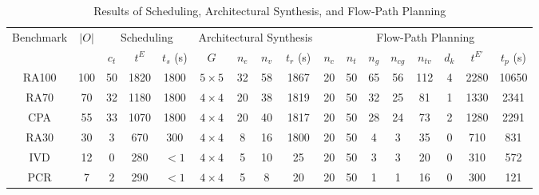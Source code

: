 \begin{table*}[ht]\normalsize
  \centering
  \caption{Results of Scheduling, Architectural Synthesis, and Flow-Path Planning}
    \begin{tabular}{|c||c||c|c|c||c|c|c|c||c|c|c|c|c|c|c|c|}\hline
    \multirow{2}[0]{*}{Benchmark} & \multirow{2}[0]{*}{$|O|$} & \multicolumn{3}{c||}{Scheduling} & \multicolumn{4}{c||}{Architectural Synthesis} & \multicolumn{8}{c|}{Flow-Path Planning} \\\cline{3-17}
          &       & $c_t$    & $t^E$    & $t_s$ (s) & $G$     & $n_e$  & $n_v$    & $t_r$ (s) & $n_c$ & $n_t$ & $n_g$ & $n_{cg}$ & $n_{tv}$ & $d_k$ & $t^{E'}$ & $t_p$ (s) \\\hline\hline
    RA100 & 100   & 50    & 1820  & 1800  & $5\times5$   & 32    & 58    & 1867  & 20    & 50    & 65    & 56    & 112   & 4     & 2280  & 10650 \\\hline
    RA70  & 70    & 32    & 1180  & 1800  & $4\times4$   & 20    & 38    & 1819  & 20    & 50    & 32    & 25    & 81    & 1     & 1330  & 2341 \\\hline
    CPA   & 55    & 33    & 1070  & 1800  & $4\times4$   & 20    & 40    & 1817  & 20    & 50    & 28    & 24    & 73    & 2     & 1280  & 2291 \\\hline
    RA30  & 30    & 3     & 670   & 300   & $4\times4$   & 8     & 16    & 1800  & 20    & 50    & 4     & 3     & 35    & 0     & 710   & 831 \\\hline
    IVD   & 12    & 0     & 280   & $<1$    & $4\times4$   & 5     & 10    & 25    & 20    & 50    & 3     & 3     & 20    & 0     & 310   & 572 \\\hline
    PCR   & 7     & 2     & 290   & $<1$    & $4\times4$   & 5     & 8     & 20    & 20    & 50    & 1     & 1     & 16    & 0     & 300   & 121 \\\hline
    \end{tabular}%
  \label{tb_test}%
\end{table*}%


